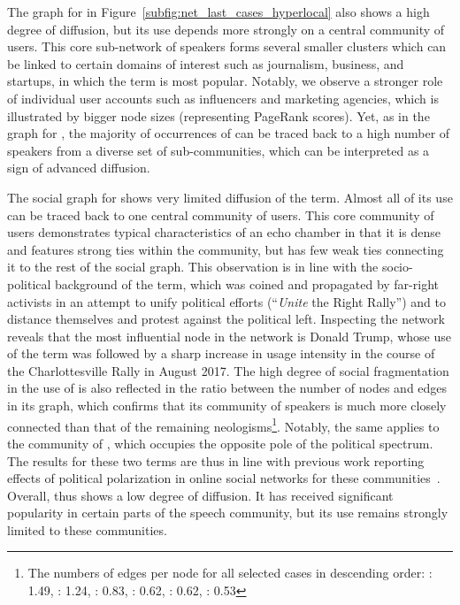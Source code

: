 \documentclass[
  a4paper,
  abstract=on,
  captions=tableabove
  ]{scrartcl}
\begin{document}
      The graph for  in Figure~\ref{subfig:net_last_cases_hyperlocal} also shows a high degree of diffusion, but its use depends more strongly on a central community of users. This core sub-network of speakers forms several smaller clusters which can be linked to certain domains of interest such as journalism, business, and startups, in which the term is most popular. Notably, we observe a stronger role of individual user accounts such as influencers and marketing agencies, which is illustrated by bigger node sizes (representing  PageRank scores). Yet, as in the graph for , the majority of occurrences of  can be traced back to a high number of speakers from a diverse set of sub-communities, which can be interpreted as a sign of advanced diffusion.

      The social graph for  shows very limited diffusion of the term. Almost all of its use can be traced back to one central community of users. This core community of users demonstrates typical characteristics of an echo chamber in that it is dense and features strong ties within the community, but  has few weak ties connecting it to the rest of the social graph. This observation is in line with the socio-political background of the term, which was coined and propagated by far-right activists in an attempt to unify political efforts (\enquote{\emph{Unite} the Right Rally}) and to distance themselves and protest against the political left. Inspecting the network reveals that the most influential node in the network is Donald Trump, whose use of the term was followed by a sharp increase in usage intensity in the course of the Charlottesville Rally in August 2017. The high degree of social fragmentation in the use of  is also reflected in the ratio between the number of nodes and edges in its graph, which confirms that its community of speakers is much more closely connected than that of the remaining neologisms\footnote{The numbers of edges per node for all selected cases in descending order: : \num{1.49}, : \num{1.24}, : \num{0.83}, : \num{0.62}, : \num{0.62}, : \num{0.53}}. Notably, the same applies to the community of , which occupies the opposite pole of the political spectrum. The results for these two terms are thus in line with previous work reporting effects of political polarization in online social networks for these communities~\parencite{Sunstein2018RepublicDivided}. Overall,  thus shows a low degree of diffusion. It has received significant popularity in certain parts of the speech community, but its use remains strongly limited to these communities.
\end{document}
